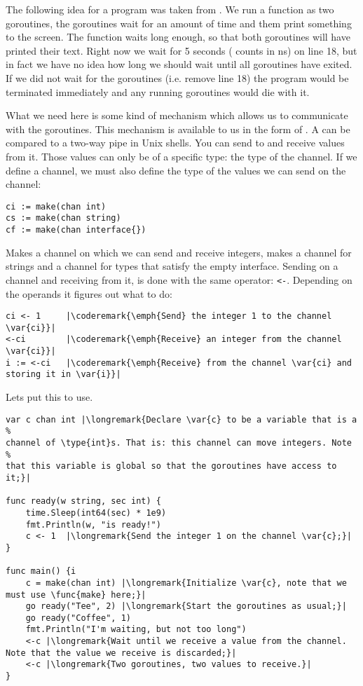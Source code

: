 The following idea for a program was taken from \cite{curso_go}. 
We run a function as two goroutines, the goroutines wait for an amount of
time and them print something to the screen. The  function
waits long enough, so that both goroutines will have printed their text. Right
now we wait for 5 seconds ( counts in ns) on line 18, but in fact we have no idea how
long we should wait until all goroutines have exited.
If we did not wait for the goroutines (i.e. remove line 18) the program
would be terminated immediately and any running goroutines would die with it. 

What we need here is some kind of mechanism which allows us to
communicate with the goroutines. This mechanism is available
to us in the form of . A  can be
compared to a two-way pipe in Unix shells. You can send to and receive
values from it. Those values can only be of a specific type: the
type of the channel. If we define a channel, we must also define the
type of the values we can send on the channel:
\begin{lstlisting}
ci := make(chan int)
cs := make(chan string)
cf := make(chan interface{})
\end{lstlisting}
Makes  a channel on which we can send and receive integers,
makes  a channel for strings and  a channel for types
that satisfy the empty interface. 
Sending on a channel and receiving from it, is done with the same operator:
\lstinline{<-}. Depending on the operands it figures out what to do:
\begin{lstlisting}
ci <- 1	    |\coderemark{\emph{Send} the integer 1 to the channel \var{ci}}|
<-ci	    |\coderemark{\emph{Receive} an integer from the channel \var{ci}}|
i := <-ci   |\coderemark{\emph{Receive} from the channel \var{ci} and storing it in \var{i}}|
\end{lstlisting}
Lets put this to use.
\begin{lstlisting}[numbers=right,caption=Go routines and a channel,label=src:sleeping with channels]
var c chan int |\longremark{Declare \var{c} to be a variable that is a %
channel of \type{int}s. That is: this channel can move integers. Note %
that this variable is global so that the goroutines have access to it;}|

func ready(w string, sec int) {
	time.Sleep(int64(sec) * 1e9)
	fmt.Println(w, "is ready!")
	c <- 1	|\longremark{Send the integer 1 on the channel \var{c};}|
}

func main() {i
	c = make(chan int) |\longremark{Initialize \var{c}, note that we must use \func{make} here;}|
	go ready("Tee", 2) |\longremark{Start the goroutines as usual;}|
	go ready("Coffee", 1)
	fmt.Println("I'm waiting, but not too long")
	<-c |\longremark{Wait until we receive a value from the channel. Note that the value we receive is discarded;}|
	<-c |\longremark{Two goroutines, two values to receive.}|
}
\end{lstlisting}
